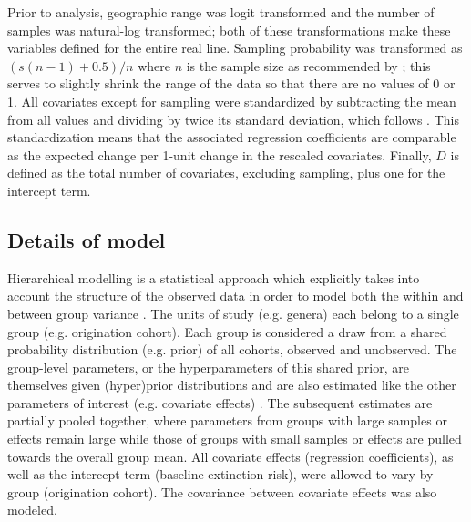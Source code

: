 \documentclass[11pt]{article}
\begin{document}

Prior to analysis, geographic range was logit transformed and the number of samples was natural-log transformed; both of these transformations make these variables defined for the entire real line. Sampling probability was transformed as \((s (n - 1) + 0.5) / n\) where \(n\) is the sample size as recommended by \citet{Smithson2006}; this serves to slightly shrink the range of the data so that there are no values of 0 or 1. All covariates except for sampling were standardized by subtracting the mean from all values and dividing by twice its standard deviation, which follows \citet{Gelman2007}. This standardization means that the associated regression coefficients are comparable as the expected change per 1-unit change in the rescaled covariates. Finally, \(D\) is defined as the total number of covariates, excluding sampling, plus one for the intercept term.



\subsection*{Details of model}
\label{sec:model}

Hierarchical modelling is a statistical approach which explicitly takes into account the structure of the observed data in order to model both the within and between group variance \citep{Gelman2013d,Gelman2007}. The units of study (e.g. genera) each belong to a single group (e.g. origination cohort). Each group is considered a draw from a shared probability distribution (e.g. prior) of all cohorts, observed and unobserved. The group-level parameters, or the hyperparameters of this shared prior, are themselves given (hyper)prior distributions and are also estimated like the other parameters of interest (e.g. covariate effects) \citep{Gelman2013d}. The subsequent estimates are partially pooled together, where parameters from groups with large samples or effects remain large while those of groups with small samples or effects are pulled towards the overall group mean. All covariate effects (regression coefficients), as well as the intercept term (baseline extinction risk), were allowed to vary by group (origination cohort). The covariance between covariate effects was also modeled. 
\end{document}
